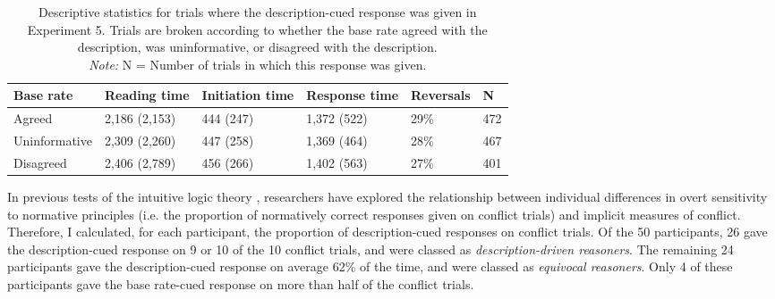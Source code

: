 \begin{table}[h]
  \centering
  \caption[Descriptive statistics for description-cued responses, Experiment 5.]{
    Descriptive statistics for trials where the description-cued response
    was given in Experiment 5.
    Trials are broken according to whether the base rate
    agreed with the description, was uninformative,
    or disagreed with the description.\\
    \emph{Note:} N = Number of trials in which this response was given.
    \label{tab:exp5_d.descriptives}
  }
  \begin{tabular}{p{3cm} p{2.5cm} p{2.1cm} p{2.1cm} p{1.75cm} p{1.75cm} }
    \toprule
    Base rate     &  Reading time & Initiation time & Response time & Reversals & N   \\
    \midrule
    Agreed        & 2,186 (2,153) & 444 (247)       & 1,372 (522)   & 29\%      & 472\\
    Uninformative & 2,309 (2,260) & 447 (258)       & 1,369 (464)   & 28\%      & 467\\
    Disagreed     & 2,406 (2,789) & 456 (266)       & 1,402 (563)   & 27\%      & 401\\
    \bottomrule
  \end{tabular}
\end{table}


In previous tests of the intuitive logic theory
\citep[e.g.][see also \citealp{Pennycook2015}]{DeNeys2011b,Mevel2014},
researchers have explored the relationship between
individual differences in overt sensitivity to normative principles
(i.e. the proportion of normatively correct responses given on conflict trials)
and implicit measures of  conflict.
Therefore, I calculated, for each participant,
the proportion of description-cued responses on conflict trials.
Of the 50 participants, 26 gave the description-cued response
on 9 or 10 of the 10 conflict trials,
and were classed as \emph{description-driven reasoners}.
The remaining 24 participants gave
the description-cued response on average 62\% of the time,
and were classed as \emph{equivocal reasoners}.
Only 4 of these participants gave the base rate-cued response
on more than half of the conflict trials.

